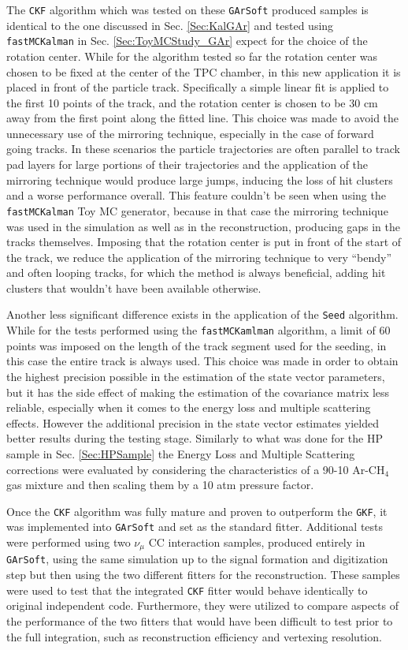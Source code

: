 The \texttt{CKF} algorithm which was tested on these \texttt{GArSoft} produced samples is identical to the one discussed in Sec. \ref{Sec:KalGAr} and tested using \texttt{fastMCKalman} in Sec. \ref{Sec:ToyMCStudy_GAr} expect for the choice of the rotation center. While for the algorithm tested so far the rotation center was chosen to be fixed at the center of the TPC chamber, in this new application it is placed in front of the particle track. Specifically a simple linear fit is applied to the first 10 points of the track, and the rotation center is chosen to be 30 cm away from the first point along the fitted line. This choice was made to avoid the unnecessary use of the mirroring technique, especially in the case of forward going tracks. In these scenarios the particle trajectories are often parallel to track pad layers for large portions of their trajectories and the application of the mirroring technique would produce large jumps, inducing the loss of hit clusters and a worse performance overall. This feature couldn't be seen when using the \texttt{fastMCKalman} Toy MC generator, because in that case the mirroring technique was used in the simulation as well as in the reconstruction, producing gaps in the tracks themselves. Imposing that the rotation center is put in front of the start of the track, we reduce the application of the mirroring technique to very \enquote{bendy} and often looping tracks, for which the method is always beneficial, adding hit clusters that wouldn't have been available otherwise. 

Another less significant difference exists in the application of the \texttt{Seed} algorithm. While for the tests performed using the \texttt{fastMCKamlman} algorithm, a limit of 60 points was imposed on the length of the track segment used for the seeding, in this case the entire track is always used. This choice was made in order to obtain the highest precision possible in the estimation of the state vector parameters, but it has the side effect of making the estimation of the covariance matrix less reliable, especially when it comes to the energy loss and multiple scattering effects. However the additional precision in the state vector estimates yielded better results during the testing stage. Similarly to what was done for the HP sample in Sec. \ref{Sec:HPSample} the Energy Loss and Multiple Scattering corrections were evaluated by considering the characteristics of a 90-10 Ar-CH$_4$ gas mixture and then scaling them by a 10 atm pressure factor.

Once the \texttt{CKF} algorithm was fully mature and proven to outperform the \texttt{GKF}, it was implemented into \texttt{GArSoft} and set as the standard fitter. Additional tests were performed using two $\nu_\mu$ CC interaction samples, produced entirely in \texttt{GArSoft}, using the same simulation up to the signal formation and digitization step but then using the two different fitters for the reconstruction. These samples were used to test that the integrated \texttt{CKF} fitter would behave identically to original independent code. Furthermore, they were utilized to compare aspects of the performance of the two fitters that would have been difficult to test prior to the full integration, such as reconstruction efficiency and vertexing resolution. 

